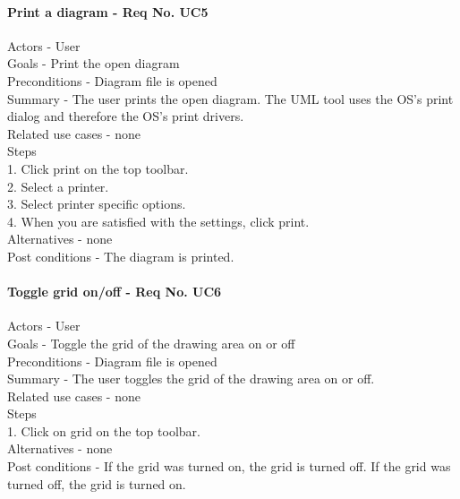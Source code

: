 \documentclass[twoside,letterpaper]{article}
\begin{document}
{\paragraph{Print a diagram - Req No. UC5\newline}
Actors - User\\
Goals - Print the open diagram\\
Preconditions - Diagram file is opened\\
Summary - The user prints the open diagram. The UML tool uses the OS's  print dialog and therefore the OS's print drivers.\\
Related use cases - none\\
Steps\\
1. Click print on the top toolbar.\\
2. Select a printer.\\
3. Select printer specific options. \\
4. When you are satisfied with the settings, click print.\\
Alternatives - none\\
Post conditions - The diagram is printed. \\

\paragraph{Toggle grid on/off - Req No. UC6\newline}
Actors - User\\
Goals - Toggle the grid of the drawing area on or off\\
Preconditions - Diagram file is opened\\
Summary - The user toggles the grid of the drawing area on or off.\\
Related use cases - none\\
Steps\\
1. Click on grid on the top toolbar.\\
Alternatives - none\\
Post conditions - If the grid was turned on, the grid is turned off. If the grid was turned off, the grid is turned on.\\

}
\end{document}
